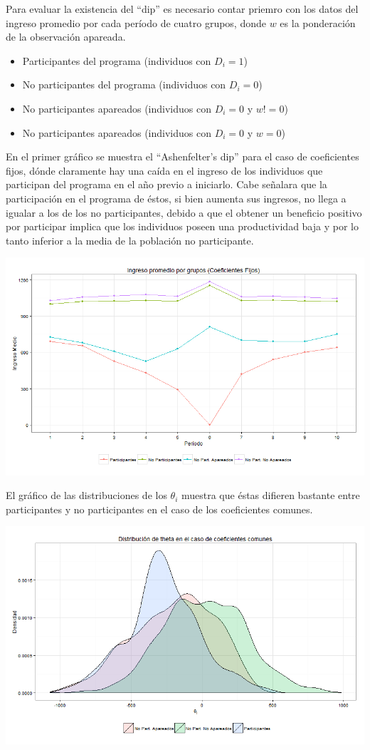 \documentclass[]{article}
\begin{document}
Para evaluar la existencia del ``dip'' es necesario contar priemro con
los datos del ingreso promedio por cada período de cuatro grupos, donde
$w$ es la ponderación de la observación apareada.

\begin{itemize}
\itemsep1pt\parskip0pt
\item
  Participantes del programa (individuos con $D_{i}=1$)
\item
  No participantes del programa (individuos con $D_{i}=0$)
\item
  No participantes apareados (individuos con $D_{i}=0$ y $w!=0$)
\item
  No participantes apareados (individuos con $D_{i}=0$ y $w=0$)
\end{itemize}

En el primer gráfico se muestra el ``Ashenfelter's dip'' para el caso de
coeficientes fijos, dónde claramente hay una caída en el ingreso de los
individuos que participan del programa en el año previo a iniciarlo.
Cabe señalara que la participación en el programa de éstos, si bien
aumenta sus ingresos, no llega a igualar a los de los no participantes,
debido a que el obtener un beneficio positivo por participar implica que
los individuos poseen una productividad baja y por lo tanto inferior a
la media de la población no participante.

\includegraphics{DipConstant.png}

El gráfico de las distribuciones de los $\theta_{i}$ muestra que éstas
difieren bastante entre participantes y no participantes en el caso de
los coeficientes comunes.

\includegraphics{ThetaConst.png}
\end{document}

